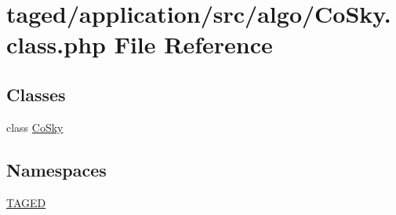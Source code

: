 \hypertarget{_co_sky_8class_8php}{}\section{taged/application/src/algo/\+Co\+Sky.class.\+php File Reference}
\label{_co_sky_8class_8php}
\subsection*{Classes}
\begin{DoxyCompactItemize}
\item 
class \hyperlink{class_co_sky}{Co\+Sky}
\end{DoxyCompactItemize}
\subsection*{Namespaces}
\begin{DoxyCompactItemize}
\item 
 \hyperlink{namespace_t_a_g_e_d}{T\+A\+G\+ED}
\end{DoxyCompactItemize}

